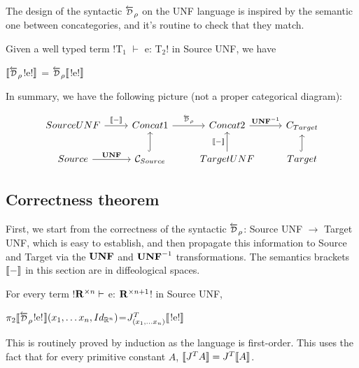 The design of the syntactic $\Dsynrevsymbol_{\rho}$ on the UNF language is inspired by the semantic one between concategories, 
and it's routine to check that they match. 

\begin{proposition}
    Given a well typed term !T$_1$ $\vdash$ e: T$_2$! in Source UNF, we have
    \begin{center}
        $\seml\Dsynrevsymbol_{\rho}$!e!$\rrbracket$ = $\Dsynrevsymbol_{\rho}\seml$!e!$\rrbracket$
    \end{center}
\end{proposition}

In summary, we have the following picture (not a proper categorical diagram):

\[
\begin{tikzcd}
    SourceUNF \ar[r,"\sem{-}"] & Concat1 \ar[r,"\Dsynrevsymbol_{\rho}"] & Concat2 \ar[r,"\UNFSymbol^{-1}"] & C_{Target} \\
    Source \ar[r,"\UNFSymbol"] & \CSource \ar[u, hook] & TargetUNF \ar[u,"\sem{-}"] & Target \ar[u, hook] 
\end{tikzcd}
\]

\subsection{Correctness theorem} %
\label{sub:Correctness theorem}

First, we start from the correctness of the syntactic $\Dsynrevsymbol_{\rho}$: Source UNF $\to$ Target UNF, which is easy to establish, 
and then propagate this information to Source and Target via the $\mathbf{UNF}$ and $\mathbf{UNF}^{-1}$ transformations. 
The semantics brackets $\llbracket -\rrbracket$ in this section are in diffeological spaces.

\begin{proposition}
    For every term !$\mathbf{R}^{\times n} \vdash$ e: $\mathbf{R}^{\times n+1}$! in Source UNF,
    \begin{center}
        $\pi_2 \seml \Dsynrevsymbol_{\rho}$!e!$\rrbracket(x_1,\ldots x_n,Id_{\mathbb{R}^n})$=$J^T_{(x_1,\ldots x_n)}\llbracket$!e!$\rrbracket$
    \end{center} 
\end{proposition}

This is routinely proved by induction as the language is first-order. 
This uses the fact that for every primitive constant $A$, $\llbracket J^TA\rrbracket=J^T\llbracket A\rrbracket$.

